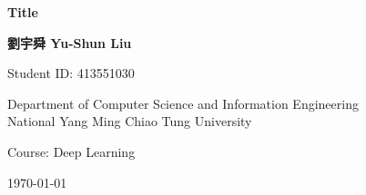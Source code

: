 \begin{titlepage}
    \begin{center}
        \vspace*{2cm}
        
        \Huge
        \textbf{Title}
        
        \vspace{1.5cm}
        
        \Large
        \textbf{劉宇舜 Yu-Shun Liu}
        
        \vspace{1cm}
        
        \large
        Student ID: 413551030
        
        \vspace{2cm}
        
        \large
        Department of Computer Science and Information Engineering\\
        National Yang Ming Chiao Tung University
        
        \vspace{1cm}
        
        \large
        Course: Deep Learning
        
        \vspace{1cm}
        
        \large
        \today
        
    \end{center}
\end{titlepage} 